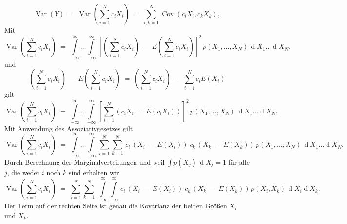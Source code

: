 \begin{equation}
\operatorname {Var}\left(Y\right) \; = \;
\operatorname {Var}\left(\sum _{{i=1}}^{N}c_i X_{i}\right) \; = \;
\sum _{{i,k=1}}^{N}\operatorname {Cov}(c_i X_{i}, c_k X_{k}),
\label{VarianzSummeISTSummeKovarianz}
\end{equation}
Mit
\begin{equation*}
\operatorname {Var}\left(\sum _{{i=1}}^{N}c_i X_{i}\right) \; = \;
\int\limits_{-\infty}^{\infty} \dots \int\limits_{-\infty}^{\infty}
\, \left[ \left(\sum_{i=1}^N c_i X_i\right) \; - \; E(\sum_{i=1}^N c_i X_i) \right]^2 \, p(X_1, \dots, X_N)
\, \operatorname{d}X_1 \dots \operatorname{d}X_N .
\end{equation*}
und
$$
\left(\sum_{i=1}^N c_i X_i \right) \; - \; E\left(\sum_{i=1}^N c_i X_i\right) \; = \;
\left(\sum_{i=1}^N c_i X_i \right) \; - \; \sum_{i=1}^N c_i E(X_i) 
$$
gilt
\begin{equation}
\operatorname {Var}\left(\sum _{{i=1}}^{N}c_i X_{i}\right) \; = \;
\int\limits_{-\infty}^{\infty} \dots \int\limits_{-\infty}^{\infty}
\, \left[ \sum_{i=1}^N \left(c_i X_i \; - \; E(c_i X_i)\right) \right]^2 \, p(X_1, \dots, X_N)
\, \operatorname{d}X_1 \dots \operatorname{d}X_N .
\end{equation}
Mit Anwendung des Assoziativgesetzes gilt
\begin{equation*}
\operatorname {Var}\left(\sum _{{i=1}}^{N}c_i X_{i}\right) \; = \;
\int\limits_{-\infty}^{\infty} \dots \int\limits_{-\infty}^{\infty}
\, \sum_{i=1}^N \sum_{k=1}^N \, c_i \,  \left(X_i \; - \; E(X_i)\right) \;
      c_k \, \left(X_k \; - \; E(X_k)\right) \, p(X_1, \dots, X_N)
\, \operatorname{d}X_1 \dots \operatorname{d}X_N .
\end{equation*}
Durch Berechnung der Marginalverteilungen und weil $\int p(X_j) \, \operatorname{d}X_j = 1$
für alle $j$, die weder $i$ noch $k$ sind erhalten wir
\begin{equation}
\operatorname {Var}\left(\sum _{{i=1}}^{N}c_i X_{i}\right) \; = \;
\sum_{i=1}^N \sum_{k=1}^N  \; 
\int\limits_{-\infty}^{\infty} \int\limits_{-\infty}^{\infty}
\, c_i \, \left(X_i \; - \; E(X_i)\right) \;
     c_k \, \left(X_k \; - \; E(X_k)\right) \, p(X_i, X_k)
\, \operatorname{d}X_i \operatorname{d}X_k .
\end{equation}
Der Term auf der rechten Seite ist genau die Kovarianz der beiden 
Größen $X_i$ und $X_k$.

